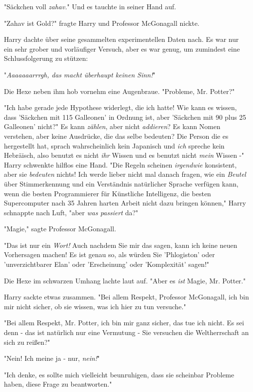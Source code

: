 {"Säckchen voll \emph{zahav.}" Und es tauchte in seiner Hand auf.

"Zahav ist Gold?" fragte Harry und Professor McGonagall nickte.

Harry dachte über seine gesammelten experimentellen Daten nach. Es war nur ein sehr grober und vorläufiger Versuch, aber es war genug, um zumindest eine Schlussfolgerung zu stützen:

"\emph{Aaaaaaarrrgh, das macht überhaupt keinen Sinn!}"

Die Hexe neben ihm hob vornehm eine Augenbraue. "Probleme, Mr. Potter?"

"Ich habe gerade jede Hypothese widerlegt, die ich hatte! Wie kann es wissen, dass 'Säckchen mit 115 Galleonen' in Ordnung ist, aber 'Säckchen mit 90 plus 25 Galleonen' nicht?" Es kann \emph{zählen}, aber nicht \emph{addieren}? Es kann Nomen verstehen, aber keine Ausdrücke, die das selbe bedeuten? Die Person die es hergestellt hat, sprach wahrscheinlich kein Japanisch und \emph{ich} spreche kein Hebräisch, also benutzt es nicht \emph{ihr} Wissen und es benutzt nicht \emph{mein} Wissen -" Harry schwenkte hilflos eine Hand. "Die Regeln scheinen \emph{irgendwie} konsistent, aber sie \emph{bedeuten} nichts! Ich werde lieber nicht mal danach fragen, wie ein \emph{Beutel} über Stimmerkennung und ein Verständnis natürlicher Sprache verfügen kann, wenn die besten Programmierer für Künstliche Intelligenz, die besten Supercomputer nach 35 Jahren harten Arbeit nicht dazu bringen können," Harry schnappte nach Luft, "aber \emph{was passiert} da?"

"Magie," sagte Professor McGonagall.

"Das ist nur ein \emph{Wort!} Auch nachdem Sie mir das sagen, kann ich keine neuen Vorhersagen machen! Es ist genau so, als würden Sie 'Phlogiston' oder 'unverzichtbarer Elan' oder 'Erscheinung' oder 'Komplexität' sagen!"

Die Hexe im schwarzen Umhang lachte laut auf. "Aber es \emph{ist} Magie, Mr. Potter."

Harry sackte etwas zusammen. "Bei allem Respekt, Professor McGonagall, ich bin mir nicht sicher, ob sie wissen, was ich hier zu tun versuche."

"Bei allem Respekt, Mr. Potter, ich bin mir ganz sicher, das tue ich nicht. Es sei denn - das ist natürlich nur eine Vermutung - Sie versuchen die Weltherrschaft an sich zu reißen?"

"Nein! Ich meine ja - nur, \emph{nein!}"

"Ich denke, es sollte mich vielleicht beunruhigen, dass sie scheinbar Probleme haben, diese Frage zu beantworten."

}
